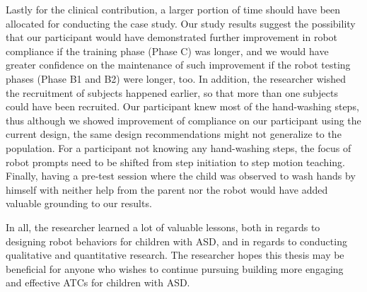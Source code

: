 Lastly for the clinical contribution, a larger portion of time should have been allocated for conducting the case study.  Our study results suggest the possibility that our participant would have demonstrated further improvement in robot compliance if the training phase (Phase C) was longer, and we would have greater confidence on the maintenance of such improvement if the robot testing phases (Phase B1 and B2) were longer, too.  In addition, the researcher wished the recruitment of subjects happened earlier, so that more than one subjects could have been recruited.  Our participant knew most of the hand-washing steps, thus although we showed improvement of compliance on our participant using the current design, the same design recommendations might not generalize to the population.  For a participant not knowing any hand-washing steps, the focus of robot prompts need to be shifted from step initiation to step motion teaching.  Finally, having a pre-test session where the child was observed to wash hands by himself with neither help from the parent nor the robot would have added valuable grounding to our results.


In all, the researcher learned a lot of valuable lessons, both in regards to designing robot behaviors for children with ASD, and in regards to conducting qualitative and quantitative research.  The researcher hopes this thesis may be beneficial for anyone who wishes to continue pursuing building more engaging and effective ATCs for children with ASD.
